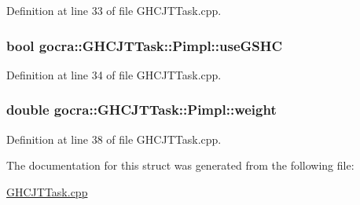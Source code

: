 Definition at line 33 of file G\+H\+C\+J\+T\+Task.\+cpp.

\subsubsection[{\texorpdfstring{use\+G\+S\+HC}{useGSHC}}]{\setlength{\rightskip}{0pt plus 5cm}bool gocra\+::\+G\+H\+C\+J\+T\+Task\+::\+Pimpl\+::use\+G\+S\+HC}\hypertarget{structgocra_1_1GHCJTTask_1_1Pimpl_a0beb46ac94216a28202956bf87fc1d2d}{}\label{structgocra_1_1GHCJTTask_1_1Pimpl_a0beb46ac94216a28202956bf87fc1d2d}


Definition at line 34 of file G\+H\+C\+J\+T\+Task.\+cpp.

\subsubsection[{\texorpdfstring{weight}{weight}}]{\setlength{\rightskip}{0pt plus 5cm}double gocra\+::\+G\+H\+C\+J\+T\+Task\+::\+Pimpl\+::weight}\hypertarget{structgocra_1_1GHCJTTask_1_1Pimpl_a5bf2a2e00bd9406bb6a993b616a47d07}{}\label{structgocra_1_1GHCJTTask_1_1Pimpl_a5bf2a2e00bd9406bb6a993b616a47d07}


Definition at line 38 of file G\+H\+C\+J\+T\+Task.\+cpp.



The documentation for this struct was generated from the following file\+:\begin{DoxyCompactItemize}
\item 
\hyperlink{GHCJTTask_8cpp}{G\+H\+C\+J\+T\+Task.\+cpp}\end{DoxyCompactItemize}
